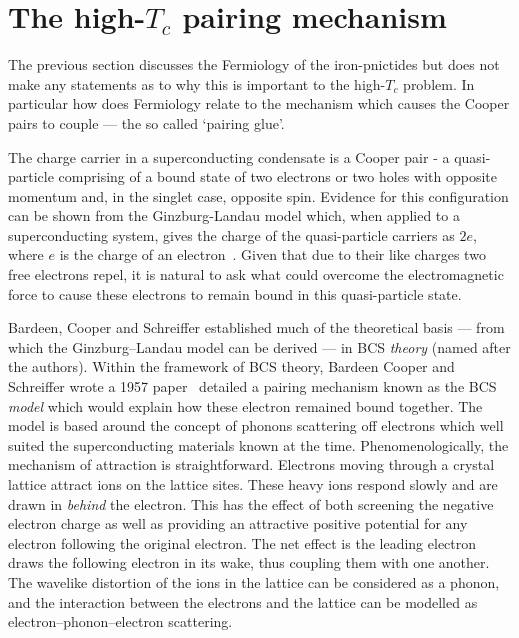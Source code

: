 

\section{The high-$T_c$ pairing mechanism}
\label{Sec:Intro:Nesting}

The previous section discusses the Fermiology of the iron-pnictides but does not make any statements as to why this is important to the high-$T_c$ problem. In particular how does Fermiology relate to the mechanism which causes the Cooper pairs to couple --- the so called `pairing glue'. 

The charge carrier in a superconducting condensate is a Cooper pair - a quasi-particle comprising of a bound state of two electrons or two holes with opposite momentum and, in the singlet case, opposite spin. Evidence for this configuration can be shown from the Ginzburg-Landau model which, when applied to a superconducting system, gives the charge of the quasi-particle carriers as $2e$, where $e$ is the charge of an electron~\cite{Annett2010}. Given that due to their like charges two free electrons repel, it is natural to ask what could overcome the electromagnetic force to cause these electrons to remain bound in this quasi-particle state.

Bardeen, Cooper and Schreiffer established much of the theoretical basis --- from which the Ginzburg--Landau model can be derived --- in \ac{BCS} \emph{theory} (named after the authors). Within the framework of \ac{BCS} theory, Bardeen Cooper and Schreiffer wrote a 1957 paper~\cite{Bardeen1957} detailed a pairing mechanism known as the \ac{BCS} \emph{model} which would explain how these electron remained bound together. The model is based around the concept of phonons scattering off electrons which well suited the superconducting materials known at the time. Phenomenologically, the mechanism of attraction is straightforward. Electrons moving through a crystal lattice attract ions on the lattice sites. These heavy ions respond slowly and are drawn in \emph{behind} the electron. This has the effect of both screening the negative electron charge as well as providing an attractive positive potential for any electron following the original electron. The net effect is the leading electron draws the following electron in its wake, thus coupling them with one another. The wavelike distortion of the ions in the lattice can be considered as a phonon, and the interaction between the electrons and the lattice can be modelled as electron--phonon--electron scattering.

